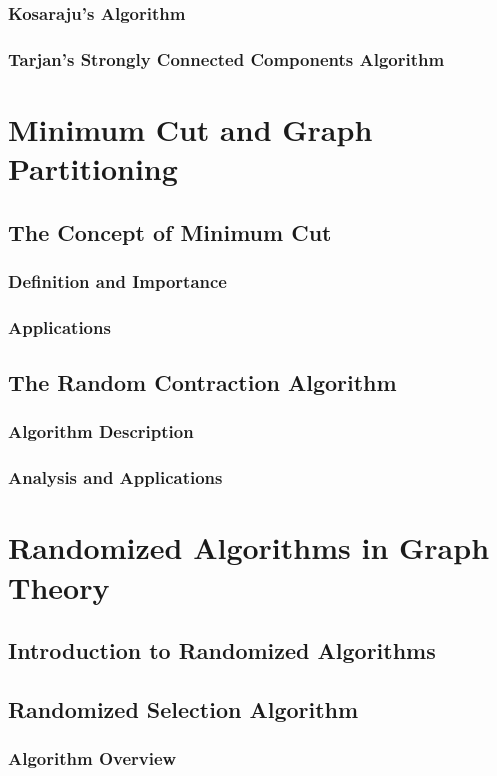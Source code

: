 \documentclass[12pt]{book} %
\begin{document}
\subsubsection{Kosaraju's Algorithm}
\subsubsection{Tarjan's Strongly Connected Components Algorithm}

\section{Minimum Cut and Graph Partitioning}
\subsection{The Concept of Minimum Cut}
\subsubsection{Definition and Importance}
\subsubsection{Applications}
\subsection{The Random Contraction Algorithm}
\subsubsection{Algorithm Description}
\subsubsection{Analysis and Applications}

\section{Randomized Algorithms in Graph Theory}
\subsection{Introduction to Randomized Algorithms}
\subsection{Randomized Selection Algorithm}
\subsubsection{Algorithm Overview}
\end{document}
